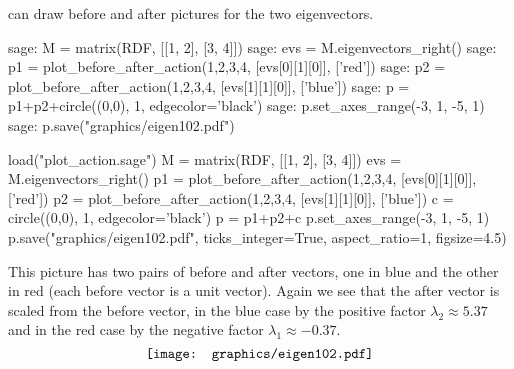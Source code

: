 \Sage{} can draw before and after pictures for the two eigenvectors.
\begin{sagecommandline}
sage: M = matrix(RDF, [[1, 2], [3, 4]])
sage: evs = M.eigenvectors_right()  
sage: p1 = plot_before_after_action(1,2,3,4, [evs[0][1][0]], ['red']) 
sage: p2 = plot_before_after_action(1,2,3,4, [evs[1][1][0]], ['blue']) 
sage: p = p1+p2+circle((0,0), 1, edgecolor='black')
sage: p.set_axes_range(-3, 1, -5, 1) 
sage: p.save("graphics/eigen102.pdf")
\end{sagecommandline}
\begin{sagesilent}
load("plot_action.sage")  
M = matrix(RDF, [[1, 2], [3, 4]])
evs = M.eigenvectors_right()  
p1 = plot_before_after_action(1,2,3,4, [evs[0][1][0]], ['red']) 
p2 = plot_before_after_action(1,2,3,4, [evs[1][1][0]], ['blue'])
c = circle((0,0), 1, edgecolor='black') 
p = p1+p2+c
p.set_axes_range(-3, 1, -5, 1) 
p.save("graphics/eigen102.pdf", ticks_integer=True, aspect_ratio=1, figsize=4.5)
\end{sagesilent}
\noindent
This picture has two pairs of before and after vectors, one in blue
and the other in red
(each before vector is a unit vector).
Again we see that 
the after vector is scaled from the before vector, 
in the blue case by the positive factor $\lambda_2\approx 5.37$ and
in the red case by the negative factor $\lambda_1\approx -0.37$.
\begin{equation*}
  \vcenteredhbox{\texttt{[image: graphics/eigen102.pdf]}}
\end{equation*}



